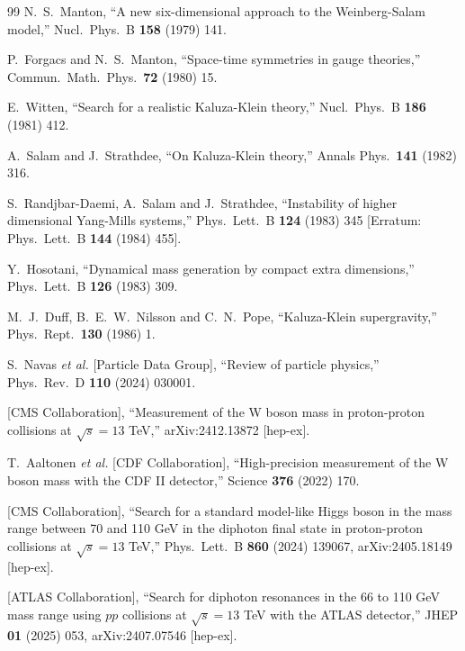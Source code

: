 \documentclass[11pt,a4paper]{article}
\theoremstyle{definition}
\begin{document}
\begin{thebibliography}{99}
 N.~S.~Manton,
``A new six-dimensional approach to the Weinberg-Salam model,''
Nucl.\ Phys.\ B {\bf 158} (1979) 141.

 P.~Forgacs and N.~S.~Manton,
``Space-time symmetries in gauge theories,''
Commun.\ Math.\ Phys.\ {\bf 72} (1980) 15.

 E.~Witten,
``Search for a realistic Kaluza-Klein theory,''
Nucl.\ Phys.\ B {\bf 186} (1981) 412.

 A.~Salam and J.~Strathdee,
``On Kaluza-Klein theory,''
Annals Phys.\ {\bf 141} (1982) 316.

 S.~Randjbar-Daemi, A.~Salam and J.~Strathdee,
``Instability of higher dimensional Yang-Mills systems,''
Phys.\ Lett.\ B {\bf 124} (1983) 345 [Erratum: Phys.\ Lett.\ B {\bf 144}
(1984) 455].

 Y.~Hosotani,
``Dynamical mass generation by compact extra dimensions,''
Phys.\ Lett.\ B {\bf 126} (1983) 309.

 M.~J.~Duff, B.~E.~W.~Nilsson and C.~N.~Pope,
``Kaluza-Klein supergravity,''
Phys.\ Rept.\ {\bf 130} (1986) 1.

 S.~Navas {\it et al.} [Particle Data Group],
``Review of particle physics,''
Phys.\ Rev.\ D {\bf 110} (2024) 030001.

 [CMS Collaboration],
``Measurement of the W boson mass in proton-proton collisions at
$\sqrt s=13$ TeV,'' arXiv:2412.13872 [hep-ex].

 T.~Aaltonen {\it et al.} [CDF Collaboration],
``High-precision measurement of the W boson mass with the CDF II
detector,'' Science {\bf 376} (2022) 170.

 [CMS Collaboration],
``Search for a standard model-like Higgs boson in the mass range between
70 and 110 GeV in the diphoton final state in proton-proton collisions at
$\sqrt s=13$ TeV,'' Phys.\ Lett.\ B {\bf 860} (2024) 139067,
arXiv:2405.18149 [hep-ex].

 [ATLAS Collaboration],
``Search for diphoton resonances in the 66 to 110 GeV mass range using
$pp$ collisions at $\sqrt s=13$ TeV with the ATLAS detector,''
JHEP {\bf 01} (2025) 053, arXiv:2407.07546 [hep-ex].

\end{thebibliography}
\end{document}
